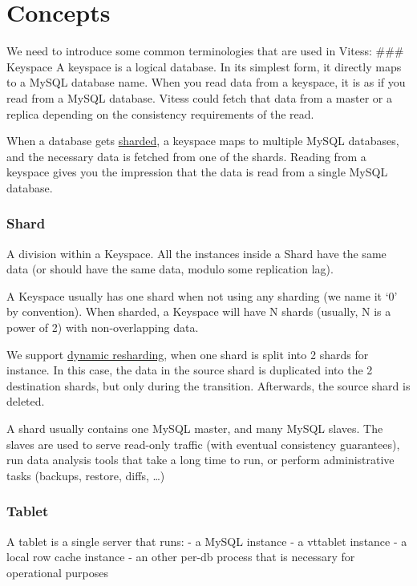 \section{Concepts}\hypertarget{concepts}{}\label{concepts}

We need to introduce some common terminologies that are used in Vitess:
\#\#\# Keyspace
A keyspace is a logical database.
In its simplest form, it directly maps to a MySQL database name.
When you read data from a keyspace, it is as if you read from a MySQL database.
Vitess could fetch that data from a master or a replica depending
on the consistency requirements of the read.

When a database gets \href{http://en.wikipedia.org/wiki/Shard\_(database\_architecture)}{sharded},
a keyspace maps to multiple MySQL databases,
and the necessary data is fetched from one of the shards.
Reading from a keyspace gives you the impression that the data is read from
a single MySQL database.

\subsubsection{Shard}\hypertarget{shard}{}\label{shard}

A division within a Keyspace. All the instances inside a Shard have the same data (or should have the same data,
modulo some replication lag).

A Keyspace usually has one shard when not using any sharding (we name it `0' by convention). When sharded, a Keyspace will have N shards (usually, N is a power of 2) with non-overlapping data.

We support \href{Resharding.markdown}{dynamic resharding}, when one shard is split into 2 shards for instance. In this case, the data in the
source shard is duplicated into the 2 destination shards, but only during the transition. Afterwards, the source shard is
deleted.

A shard usually contains one MySQL master, and many MySQL slaves. The slaves are used to serve read-only traffic (with
eventual consistency guarantees), run data analysis tools that take a long time to run, or perform administrative tasks (backups, restore, diffs, \ldots{})

\subsubsection{Tablet}\hypertarget{tablet}{}\label{tablet}

A tablet is a single server that runs:
- a MySQL instance
- a vttablet instance
- a local row cache instance
- an other per-db process that is necessary for operational purposes

